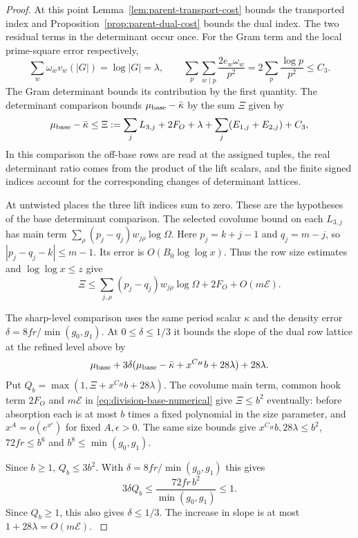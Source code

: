 \begin{proof}
At this point Lemma~\ref{lem:parent-transport-cost} bounds the
transported index and Proposition~\ref{prop:parent-dual-cost}
bounds the dual index. The two residual terms in the determinant
occur once. For the Gram term and the local prime-square error respectively,
\[
 \sum_w\omega_w v_w(|G|)=\log|G|=\lambda,\qquad
 \sum_p\sum_{w\mid p}\frac{2e_w\omega_w}{p^2}
   =2\sum_p\frac{\log p}{p^2}\le C_3 .
\]
The Gram determinant bounds its contribution by the first quantity.
\label{cor:word-division-6}
The determinant comparison bounds \(\mu_{\rm base}-\bar\kappa\)
by the sum \(\Xi\) given by
\[
 \mu_{\rm base}-\bar\kappa\le
 \Xi:=\sum_j L_{3,j}+2F_O+\lambda+
                     \sum_j(E_{1,j}+E_{2,j})+C_3,
\]
In this comparison the off-base rows are read at the assigned
tuples, the real determinant ratio comes from the product of
the lift scalars, and the finite signed indices account for the
corresponding changes of determinant lattices.

At untwisted
places the three lift indices sum to zero. These are the
hypotheses of the base determinant comparison.
The selected covolume bound on each \(L_{3,j}\) has main
term \(\sum_\rho(p_j-q_j)w_{j\rho}\log\Omega\).
Here \(p_j=k+j-1\) and \(q_j=m-j\), so
\(|p_j-q_j-k|\le m-1\). Its error is \(O(B_0\log\log x)\).
Thus the row size estimates and \(\log\log x\le z\) give
\begin{equation}\label{eq:division-base-numerical}
 \Xi\le \sum_{j,\rho}(p_j-q_j)w_{j\rho}\log\Omega
                   +2F_O+O(m\mathcal E).
\end{equation}

The sharp-level comparison uses the same period scalar
\(\kappa\) and the density error \(\delta=8fr/\min(g_0,g_1)\).
At \(0\le\delta\le1/3\) it bounds the slope of the dual row lattice at the refined level
above by
\[
 \mu_{\rm base}+3\delta(\mu_{\rm base}-\bar\kappa
                          +x^{C_H}b+28\lambda)+28\lambda .
\]
Put \(Q_b=\max(1,\Xi+x^{C_H}b+28\lambda)\). The covolume main
term, common hook term \(2F_O\) and \(m\mathcal E\) in
\eqref{eq:division-base-numerical} give \(\Xi\le b^2\) eventually:
before absorption each is at most \(b\) times a fixed polynomial
in the size parameter, and \(x^A=o(e^{x^\epsilon})\) for fixed
\(A,\epsilon>0\). The same size bounds give \(x^{C_H}b,28\lambda\le b^2\),
\(72fr\le b^6\) and \(b^8\le\min(g_0,g_1)\).

Since \(b\ge1\),
\(Q_b\le3b^2\). With \(\delta=8fr/\min(g_0,g_1)\) this gives
\[
 3\delta Q_b\le \frac{72fr\,b^2}{\min(g_0,g_1)}\le1 .
\]
Since \(Q_b\ge1\), this also gives \(\delta\le1/3\). The increase
in slope is at most \(1+28\lambda=O(m\mathcal E)\).
\label{cor:word-division-7}
\end{proof}

